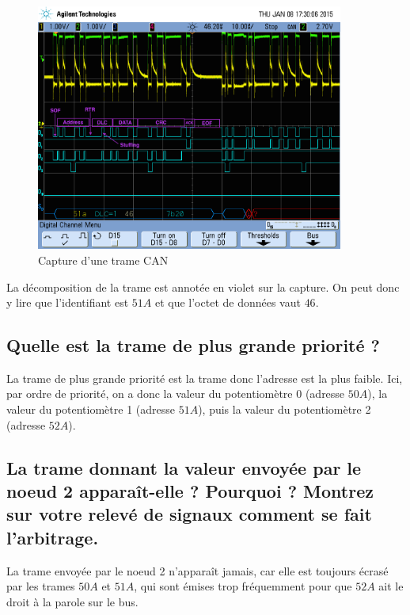 \documentclass[12pt]{article}
\begin{document}
\begin{figure}[H]
\centering
\includegraphics[width=0.9\textwidth]{releve_1.png}
\caption{Capture d'une trame CAN}
\end{figure}

La décomposition de la trame est annotée en violet sur la capture. On peut donc y lire que l'identifiant est $51A$ et que l'octet de données vaut $46$.

\subsection{Quelle est la trame de plus grande priorité ?}

La trame de plus grande priorité est la trame donc l'adresse est la plus faible. Ici, par ordre de priorité, on a donc la valeur du potentiomètre 0 (adresse $50A$), la valeur du potentiomètre 1 (adresse $51A$), puis la valeur du potentiomètre 2 (adresse $52A$).

\subsection{La trame donnant la valeur envoyée par le noeud 2 apparaît-elle ? Pourquoi ? Montrez sur votre relevé de signaux comment se fait l'arbitrage.}

La trame envoyée par le noeud 2 n'apparaît jamais, car elle est toujours écrasé par les trames $50A$ et $51A$, qui sont émises trop fréquemment pour que $52A$ ait le droit à la parole sur le bus.
\end{document}
